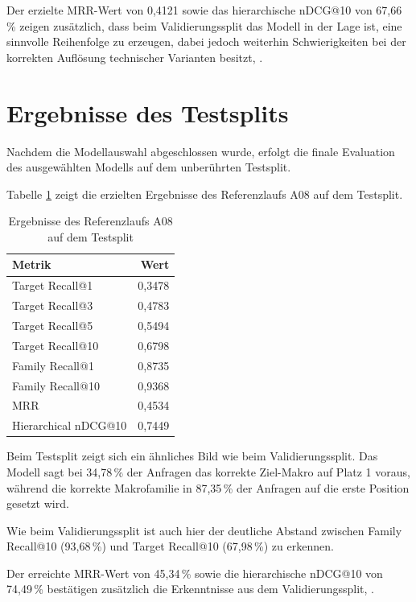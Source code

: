 Der erzielte MRR-Wert von 0,4121 sowie das hierarchische nDCG@10 von 67,66\,\% zeigen zusätzlich, dass beim Validierungssplit das Modell in der Lage ist, eine sinnvolle Reihenfolge zu erzeugen, 
dabei jedoch weiterhin Schwierigkeiten bei der korrekten Auflösung technischer Varianten besitzt, \parencite{LTR_Configuration_Test_Series}.

\section{Ergebnisse des Testsplits}

Nachdem die Modellauswahl abgeschlossen wurde, erfolgt die finale Evaluation des ausgewählten Modells auf dem unberührten Testsplit.

Tabelle \ref{tab:test_ergebnisse} zeigt die erzielten Ergebnisse des Referenzlaufs A08 auf dem Testsplit. 

\begin{table}[H] 
  \centering 
  \caption{Ergebnisse des Referenzlaufs A08 auf dem Testsplit} 
  \label{tab:test_ergebnisse} 
  \begin{tabular}{lr} \toprule \textbf{Metrik} & \textbf{Wert} \\ \midrule 
    Target Recall@1 & 0,3478 \\
    Target Recall@3 & 0,4783 \\
    Target Recall@5 & 0,5494 \\
    Target Recall@10 & 0,6798 \\
    Family Recall@1 & 0,8735 \\
    Family Recall@10 & 0,9368 \\
    MRR & 0,4534 \\
    Hierarchical nDCG@10 & 0,7449 \\
    \bottomrule 
  \end{tabular} 
\end{table}

Beim Testsplit zeigt sich ein ähnliches Bild wie beim Validierungssplit. Das Modell sagt bei 34,78\,\% der Anfragen das korrekte Ziel-Makro \parencite{EPLAN-Makros} auf Platz 1 voraus, während die korrekte Makrofamilie in 87,35\,\% der Anfragen auf die erste Position gesetzt wird.

Wie beim Validierungssplit ist auch hier der deutliche Abstand zwischen Family Recall@10 (93,68\,\%) und Target Recall@10 (67,98\,\%) zu erkennen. 

Der erreichte MRR-Wert von 45,34\,\% sowie die hierarchische nDCG@10 von 74,49\,\% bestätigen zusätzlich die Erkenntnisse aus dem Validierungssplit, \parencite{LTR_Configuration_Test_Series}.


